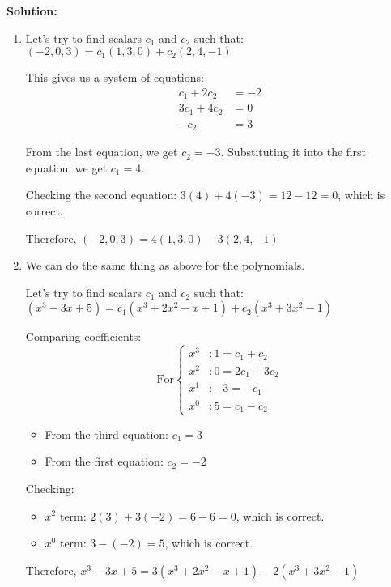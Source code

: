 \documentclass{article}
\begin{document}
\textbf{Solution:}
\begin{enumerate}[label=(\alph*)]
\item Let's try to find scalars $c_1$ and $c_2$ such that:
$(-2,0,3) = c_1(1,3,0) + c_2(2,4,-1)$

This gives us a system of equations:
\begin{align*}
c_1 + 2c_2 &= -2 \\
3c_1 + 4c_2 &= 0 \\
-c_2 &= 3
\end{align*}

From the last equation, we get $c_2 = -3$.
Substituting it into the first equation, we get $c_1 = 4$.

Checking the second equation:
$3(4) + 4(-3) = 12 - 12 = 0$, which is correct.

Therefore, $(-2,0,3) = 4(1,3,0) - 3(2,4,-1)$

\item We can do the same thing as above for the polynomials.

Let's try to find scalars $c_1$ and $c_2$ such that:
$(x^3 - 3x + 5) = c_1(x^3 + 2x^2 - x + 1) + c_2(x^3 + 3x^2 - 1)$

Comparing coefficients:
\[
\text{For}
\left\{
\begin{aligned}
x^3&: 1 = c_1 + c_2 \\
x^2&: 0 = 2c_1 + 3c_2 \\
x^1&: -3 = -c_1 \\
x^0&: 5 = c_1 - c_2
\end{aligned}
\right.
\]

\begin{itemize}
    \item From the third equation: $c_1 = 3$
    \item From the first equation: $c_2 = -2$
\end{itemize}

Checking:
\begin{itemize}
    \item $x^2$ term: $2(3) + 3(-2) = 6 - 6 = 0$, which is correct.
    \item $x^0$ term: $3 - (-2) = 5$, which is correct.
\end{itemize}

Therefore, $x^3 - 3x + 5 = 3(x^3 + 2x^2 - x + 1) - 2(x^3 + 3x^2 - 1)$

\end{enumerate}

\newpage
\end{document}
